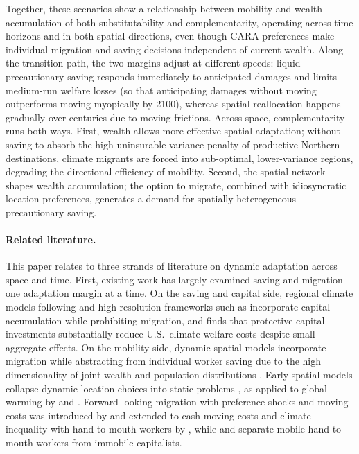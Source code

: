 \documentclass[11pt, a4paper]{article}
\begin{document}
Together, these scenarios show a relationship between mobility and wealth accumulation of both substitutability and complementarity, operating across time horizons and in both spatial directions, even though CARA preferences make individual migration and saving decisions independent of current wealth. Along the transition path, the two margins adjust at different speeds: liquid precautionary saving responds immediately to anticipated damages and limits medium-run welfare losses (so that anticipating damages without moving outperforms moving myopically by 2100), whereas spatial reallocation happens gradually over centuries due to moving frictions. Across space, complementarity runs both ways. First, wealth allows more effective spatial adaptation; without saving to absorb the high uninsurable variance penalty of productive Northern destinations, climate migrants are forced into sub-optimal, lower-variance regions, degrading the directional efficiency of mobility. Second, the spatial network shapes wealth accumulation; the option to migrate, combined with idiosyncratic location preferences, generates a demand for spatially heterogeneous precautionary saving.


\paragraph{Related literature.} This paper relates to three strands of literature on dynamic adaptation across space and time. First, existing work has largely examined saving and migration one adaptation margin at a time. On the saving and capital side, regional climate models following \citet{nordhaus_regional_1996} and high-resolution frameworks such as \citet{krusell_climate_2022} incorporate capital accumulation while prohibiting migration, and \citet{fried_seawalls_2022} finds that protective capital investments substantially reduce U.S.\ climate welfare costs despite small aggregate effects. On the mobility side, dynamic spatial models incorporate migration while abstracting from individual worker saving due to the high dimensionality of joint wealth and population distributions \citep{desmet_spatial_2025}. Early spatial models collapse dynamic location choices into static problems \citep{desmet_geography_2018}, as applied to global warming by \citet{cruz_economic_2024} and \citet{desmet_climate_2024}. Forward-looking migration with preference shocks and moving costs was introduced by \citet{caliendo_trade_2019} and extended to cash moving costs and climate inequality with hand-to-mouth workers by \citet{tuting_climate_2025}, while \citet{kleinman_dynamic_2023} and \citet{bilal_anticipating_nodate} separate mobile hand-to-mouth workers from immobile capitalists.
\end{document}

